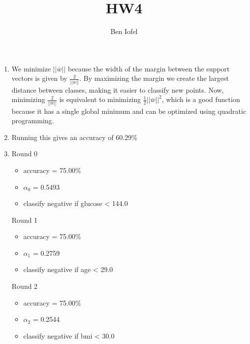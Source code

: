 \documentclass[11pt]{article}
\author{Ben Iofel}
\date{}
\title{HW4}
\begin{document}
\maketitle
\begin{enumerate}
\item We minimize \(||\bar{w}||\) because the width of the margin between the support vectors is given by \(\frac{2}{||\bar{w}||}\). By maximizing the margin we create the largest distance between classes, making it easier to classify new points. Now, minimizing \(\frac{2}{||\bar{w}||}\) is equivalent to minimizing \(\frac{1}{2}||\bar{w}||^2\), which is a good function because it has a single global minimum and can be optimized using quadratic programming.
\item Running this gives an accuracy of 60.29\%
\item Round 0
\begin{itemize}
\item accuracy = 75.00\%
\item \(\alpha_{\text{0}}\) = 0.5493
\item classify negative if glucose < 144.0
\end{itemize}

Round 1
\begin{itemize}
\item accuracy = 75.00\%
\item \(\alpha_{\text{1}}\) = 0.2759
\item classify negative if age < 29.0
\end{itemize}

Round 2
\begin{itemize}
\item accuracy = 75.00\%
\item \(\alpha_{\text{2}}\) = 0.2544
\item classify negative if bmi < 30.0
\end{itemize}
\end{enumerate}
\end{document}

